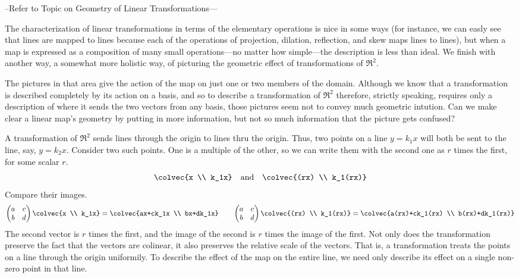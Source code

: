 --Refer to Topic on Geometry of Linear Transformations---

The characterization of linear transformations in terms of the 
elementary operations is nice in some ways (for instance, we can easly see that
lines are mapped to lines because each of the operations of 
projection, dilation, reflection, and skew maps lines to lines),
but when a map is expressed as a composition of many small operations---no
matter how simple---the description is less than ideal.
We finish with another way, a somewhat more holistic way,
of picturing the geometric effect of
transformations of $\Re^2$.

The pictures in that area give the action of the 
map on just one or two members of the domain.
Although we know that a transformation is described completely by its action
on a basis, and so to describe a transformation of
$\Re^2$ therefore, strictly speaking, 
requires only a description of where it sends the two vectors
from any basis, 
those pictures seem not to convey much geometric intution.
Can we make clear a linear map's geometry by putting in more 
information, but not so much information that the picture gets confused?

A transformation of $\Re^2$ sends lines through the origin to lines thru
the origin.
Thus, two points on a line $y=k_1x$ will both be sent to the line,
say, $y=k_2x$.
Consider two such points.
One is a multiple of the other, so we can write them with the second one as 
$r$ times the first, for some scalar $r$.
\begin{equation*}
  \colvec{x \\ k_1x}\quad\mbox{and}\quad\colvec{(rx) \\ k_1(rx)}
\end{equation*}
Compare their images.
\begin{equation*}
  \begin{pmatrix}
    a  &c  \\
    b  &d
  \end{pmatrix}
  \colvec{x \\ k_1x}
  =
  \colvec{ax+ck_1x \\ bx+dk_1x}
  \qquad
  \begin{pmatrix}
    a  &c  \\
    b  &d
  \end{pmatrix}
  \colvec{(rx) \\ k_1(rx)}
  =
  \colvec{a(rx)+ck_1(rx) \\ b(rx)+dk_1(rx)}
\end{equation*}
The second vector is $r$ times the first, and the image of the 
second is $r$ times the image of the first.
Not only does the transformation preserve the fact that the vectors are
colinear, it also preserves the relative scale of the vectors.
That is, a transformation treats the points on a line through the origin
uniformily.
To describe the effect of the map on the entire line, we need only describe
its effect on a single non-zero point in that line.

